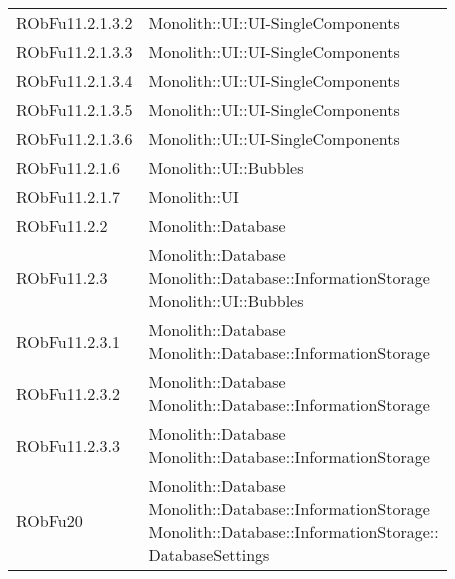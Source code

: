 \begin{center}
\begin{longtable}{|
*{1}{>{\centering\arraybackslash}m{2.5cm}|}
*{1}{>{\centering\arraybackslash}m{7.5cm}|}}
{\\}\\\hline
RObFu11.2.1.3.2 & \makecell[l]{Monolith::UI::UI-SingleComponents
\\}\\\hline
RObFu11.2.1.3.3 & \makecell[l]{Monolith::UI::UI-SingleComponents
\\}\\\hline
RObFu11.2.1.3.4 & \makecell[l]{Monolith::UI::UI-SingleComponents
\\}\\\hline
RObFu11.2.1.3.5 & \makecell[l]{Monolith::UI::UI-SingleComponents
\\}\\\hline
RObFu11.2.1.3.6 & \makecell[l]{Monolith::UI::UI-SingleComponents
\\}\\\hline
RObFu11.2.1.6 & \makecell[l]{Monolith::UI::Bubbles
\\}\\\hline
RObFu11.2.1.7 & \makecell[l]{Monolith::UI
\\}\\\hline
RObFu11.2.2 & \makecell[l]{Monolith::Database
\\}\\\hline
RObFu11.2.3 & \makecell[l]{Monolith::Database
\\Monolith::Database::InformationStorage
\\Monolith::UI::Bubbles
\\}\\\hline
RObFu11.2.3.1 & \makecell[l]{Monolith::Database
\\Monolith::Database::InformationStorage
\\}\\\hline
RObFu11.2.3.2 & \makecell[l]{Monolith::Database
\\Monolith::Database::InformationStorage
\\}\\\hline
RObFu11.2.3.3 & \makecell[l]{Monolith::Database
\\Monolith::Database::InformationStorage
\\}\\\hline
RObFu20 & \makecell[l]{Monolith::Database
\\Monolith::Database::InformationStorage
\\Monolith::Database::InformationStorage:: \\ \hfill DatabaseSettings
\\}\\\hline

\end{longtable}
\end{center}
